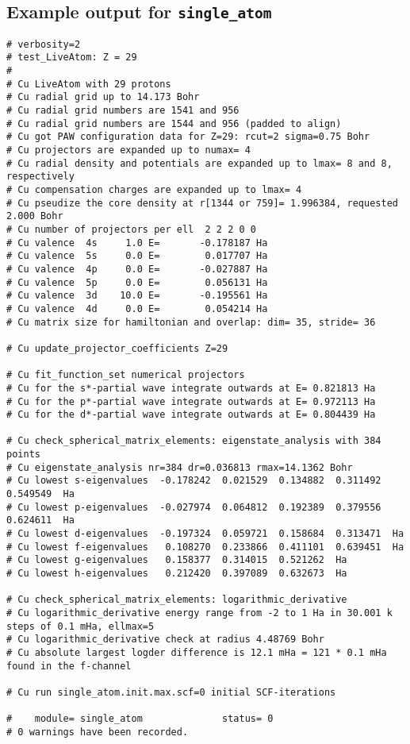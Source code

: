 \documentclass[oribibl]{llncs}
\newcommand{\ttt}[1]{\texttt{#1}}
\begin{document}
\newpage

\subsection{Example output for \ttt{single\_atom}} \label{sec:example-output-for-single-atom}
\small
\begin{verbatim}
# verbosity=2
# test_LiveAtom: Z = 29
#
# Cu LiveAtom with 29 protons
# Cu radial grid up to 14.173 Bohr
# Cu radial grid numbers are 1541 and 956
# Cu radial grid numbers are 1544 and 956 (padded to align)
# Cu got PAW configuration data for Z=29: rcut=2 sigma=0.75 Bohr
# Cu projectors are expanded up to numax= 4
# Cu radial density and potentials are expanded up to lmax= 8 and 8, respectively
# Cu compensation charges are expanded up to lmax= 4
# Cu pseudize the core density at r[1344 or 759]= 1.996384, requested 2.000 Bohr
# Cu number of projectors per ell  2 2 2 0 0
# Cu valence  4s     1.0 E=       -0.178187 Ha
# Cu valence  5s     0.0 E=        0.017707 Ha
# Cu valence  4p     0.0 E=       -0.027887 Ha
# Cu valence  5p     0.0 E=        0.056131 Ha
# Cu valence  3d    10.0 E=       -0.195561 Ha
# Cu valence  4d     0.0 E=        0.054214 Ha
# Cu matrix size for hamiltonian and overlap: dim= 35, stride= 36

# Cu update_projector_coefficients Z=29

# Cu fit_function_set numerical projectors
# Cu for the s*-partial wave integrate outwards at E= 0.821813 Ha
# Cu for the p*-partial wave integrate outwards at E= 0.972113 Ha
# Cu for the d*-partial wave integrate outwards at E= 0.804439 Ha

# Cu check_spherical_matrix_elements: eigenstate_analysis with 384 points
# Cu eigenstate_analysis nr=384 dr=0.036813 rmax=14.1362 Bohr
# Cu lowest s-eigenvalues  -0.178242  0.021529  0.134882  0.311492  0.549549  Ha
# Cu lowest p-eigenvalues  -0.027974  0.064812  0.192389  0.379556  0.624611  Ha
# Cu lowest d-eigenvalues  -0.197324  0.059721  0.158684  0.313471  Ha
# Cu lowest f-eigenvalues   0.108270  0.233866  0.411101  0.639451  Ha
# Cu lowest g-eigenvalues   0.158377  0.314015  0.521262  Ha
# Cu lowest h-eigenvalues   0.212420  0.397089  0.632673  Ha

# Cu check_spherical_matrix_elements: logarithmic_derivative
# Cu logarithmic_derivative energy range from -2 to 1 Ha in 30.001 k steps of 0.1 mHa, ellmax=5
# Cu logarithmic_derivative check at radius 4.48769 Bohr
# Cu absolute largest logder difference is 12.1 mHa = 121 * 0.1 mHa found in the f-channel

# Cu run single_atom.init.max.scf=0 initial SCF-iterations

#    module= single_atom              status= 0
# 0 warnings have been recorded.
\end{verbatim}
\normalsize
%
\end{document}
